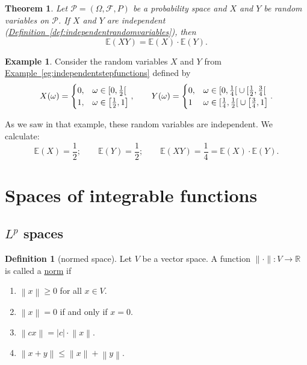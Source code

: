 \documentclass[a4paper]{scrartcl}
\newcommand{\R}{\mathbb{R}}
\newcommand{\E}{\mathbb{E}}
\newcommand{\defn}[1]{\ul{#1}}
\newcommand{\norm}[1]{\left\|#1\right\|}
\theoremstyle{definition}
\newtheorem{definition}{Definition}[section]
\newtheorem{example}{Example}[section]
\theoremstyle{plain}
\newtheorem{theorem}{Theorem}[section]
\theoremstyle{remark}
\begin{document}
\begin{theorem}
  Let $\mathcal{P} = (\Omega, \mathcal{F}, P)$ be a probability space and $X$ and $Y$ be random variables on $\mathcal{P}$. If $X$ and $Y$ are independent (\hyperref[def:independentrandomvariables]{Definition~\ref*{def:independentrandomvariables}}), then
  \begin{equation*}
    \mathbb{E}(XY) = \mathbb{E}(X) \cdot \mathbb{E}(Y).
  \end{equation*}
\end{theorem}

\begin{example}
  Consider the random variables $X$ and $Y$ from \hyperref[eg:independentstepfunctions]{Example~\ref*{eg:independentstepfunctions}} defined by
  \begin{equation*}
    X(\omega) =
    \begin{cases}
      0, &\omega \in \interval[open right]{0}{\frac{1}{2}} \\
      1, &\omega \in \left[ \frac{1}{2}, 1 \right]
    \end{cases},
    \qquad
    Y(\omega) =
    \begin{cases}
      0, & \omega \in \interval[open right]{0}{\frac{1}{4}} \cup \interval[open right]{\frac{1}{2}}{\frac{3}{4}} \\
      1 & \omega \in \interval[open right]{\frac{1}{4}}{\frac{1}{2}} \cup \left[ \frac{3}{4}, 1 \right]
    \end{cases}.
  \end{equation*}

  As we saw in that example, these random variables are independent. We calculate:
  \begin{equation*}
    \E(X) = \frac{1}{2};\qquad \E(Y) = \frac{1}{2};\qquad \E(XY) = \frac{1}{4} = \E(X)\cdot \E(Y).
  \end{equation*}
\end{example}

\section{Spaces of integrable functions}
\subsection{\texorpdfstring{$L^{p}$}{Lg} spaces}
\begin{definition}[normed space]
  \label{def:normedspace}
  Let $V$ be a vector space. A function $\|\cdot\|\colon V \to \R$ is called a \defn{norm} if
  \begin{enumerate}
    \item $\norm{x} \geq 0$ for all $x \in V$.

    \item $\norm{x} = 0$ if and only if $x = 0$.

    \item $\norm{cx} = \left|c\right|\cdot\norm{x}$.

    \item $\norm{x+y} \leq \norm{x} + \norm{y}$.
  \end{enumerate}
\end{definition}
\end{document}
